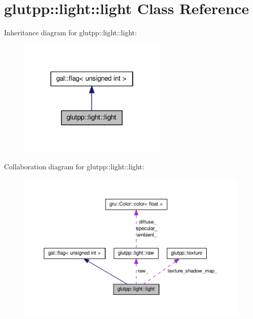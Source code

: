 \hypertarget{classglutpp_1_1light_1_1light}{\section{glutpp\-:\-:light\-:\-:light \-Class \-Reference}
\label{classglutpp_1_1light_1_1light}
}


\-Inheritance diagram for glutpp\-:\-:light\-:\-:light\-:
\nopagebreak
\begin{figure}[H]
\begin{center}
\leavevmode
\includegraphics[width=202pt]{classglutpp_1_1light_1_1light__inherit__graph}
\end{center}
\end{figure}


\-Collaboration diagram for glutpp\-:\-:light\-:\-:light\-:
\nopagebreak
\begin{figure}[H]
\begin{center}
\leavevmode
\includegraphics[width=350pt]{classglutpp_1_1light_1_1light__coll__graph}
\end{center}
\end{figure}

